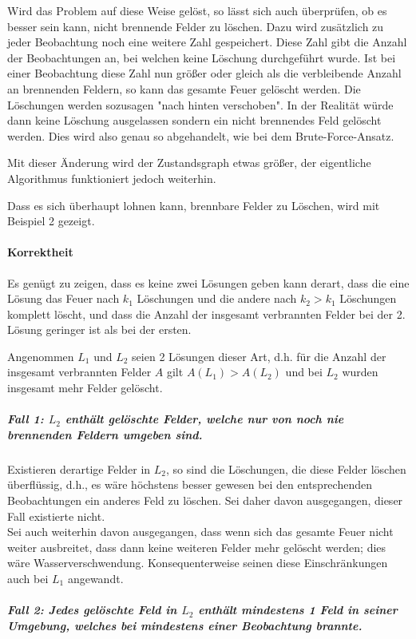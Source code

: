 Wird das Problem auf diese Weise gelöst, so lässt sich auch überprüfen, ob es besser sein kann, nicht brennende Felder zu löschen. Dazu wird zusätzlich zu jeder Beobachtung noch eine weitere Zahl gespeichert. Diese Zahl gibt die Anzahl der Beobachtungen an, bei welchen keine Löschung durchgeführt wurde. Ist bei einer Beobachtung diese Zahl nun größer oder gleich als die verbleibende Anzahl an brennenden Feldern, so kann das gesamte Feuer gelöscht werden. Die Löschungen werden sozusagen "nach hinten verschoben". In der Realität würde dann keine Löschung ausgelassen sondern ein nicht brennendes Feld gelöscht werden. Dies wird also genau so abgehandelt, wie bei dem Brute-Force-Ansatz.

Mit dieser Änderung wird der Zustandsgraph etwas größer, der eigentliche Algorithmus funktioniert jedoch weiterhin.

Dass es sich überhaupt lohnen kann, brennbare Felder zu Löschen, wird mit Beispiel 2 gezeigt.

\paragraph{Korrektheit}

Es genügt zu zeigen, dass es keine zwei Lösungen geben kann derart, dass die eine Lösung das Feuer nach $k_1$ Löschungen und die andere nach $k_2 > k_1$ Löschungen komplett löscht, und dass die Anzahl der insgesamt verbrannten Felder bei der 2. Lösung geringer ist als bei der ersten. 

Angenommen $L_1$ und $L_2$ seien 2 Lösungen dieser Art, d.h. für die Anzahl der insgesamt verbrannten Felder $A$ gilt $A(L_1) > A(L_2)$ und bei $L_2$ wurden insgesamt mehr Felder gelöscht.

\subparagraph{Fall 1: $L_2$ enthält gelöschte Felder, welche nur von noch nie brennenden Feldern umgeben sind.} 

Existieren derartige Felder in $L_2$, so sind die Löschungen, die diese Felder löschen überflüssig, d.h., es wäre höchstens besser gewesen bei den entsprechenden Beobachtungen ein anderes Feld zu löschen. Sei daher davon ausgegangen, dieser Fall existierte nicht.\\
Sei auch weiterhin davon ausgegangen, dass wenn sich das gesamte Feuer nicht weiter ausbreitet, dass dann keine weiteren Felder mehr gelöscht werden; dies wäre Wasserverschwendung. Konsequenterweise seinen diese Einschränkungen auch bei $L_1$ angewandt.

\subparagraph{Fall 2: Jedes gelöschte Feld in $L_2$ enthält mindestens 1 Feld in seiner Umgebung, welches bei mindestens einer Beobachtung brannte.} 

